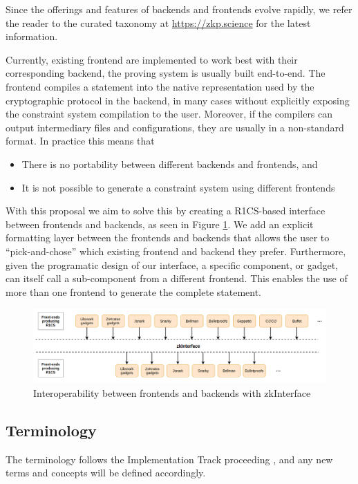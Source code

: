 \documentclass[a4paper,12pt]{article}
\begin{document}
Since the offerings and features of backends and frontends evolve rapidly, we refer the reader to the curated taxonomy at \url{https://zkp.science} for the latest information.  

Currently, existing frontend are implemented to work best with their corresponding backend, the proving system is usually built end-to-end. The frontend compiles a statement into the native representation used by the cryptographic protocol in the backend, in many cases without explicitly exposing the constraint system compilation to the user. Moreover, if the compilers can output intermediary files and configurations, they are usually in a non-standard format. In practice this means that
\begin{itemize}
	\item There is no portability between different backends and frontends, and
	\item It is not possible to generate a constraint system using different frontends
\end{itemize}   

With this proposal we aim to solve this by creating a R1CS-based interface between frontends and backends, as seen in Figure \ref{interface}. We add an explicit formatting layer between the frontends and backends that allows the user to ``pick-and-chose'' which existing frontend and backend they prefer. Furthermore, given the programatic design of our interface, a specific component, or gadget, can itself call a sub-component from a different frontend. This enables the use of more than one frontend to generate the complete statement.

\begin{figure}[h!]
	\includegraphics[width=\linewidth]{interop.png}
	\caption{Interoperability between frontends and backends with zkInterface}
	\label{interface}
\end{figure}

\subsection{Terminology}
The terminology follows the Implementation Track proceeding \cite{ZKProofImplementation}, and any new terms and concepts will be defined accordingly.
\end{document}
